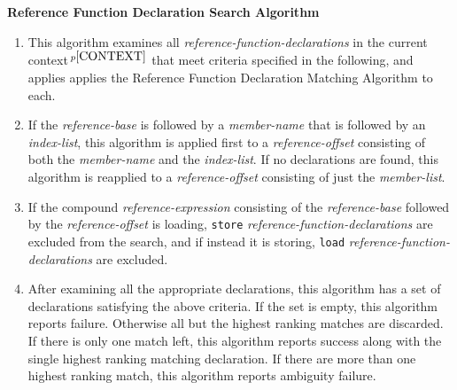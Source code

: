 \documentclass[12pt]{article}
\newcommand{\pagnote}[1]{$\,^{p\pageref{#1}}$}
\begin{document}
\centerline{\bf Reference Function Declaration Search Algorithm}
\begin{enumerate}
\item This algorithm examines all {\em reference-function-declarations}
in the current context\pagnote{CONTEXT} that meet criteria specified in
the following, and applies applies the Reference Function Declaration Matching
Algorithm to each.
\item If the {\em reference-base} is followed by a {\em member-name}
that is followed by an {\em index-list}, this algorithm is applied first
to a {\em reference-offset} consisting of both the {\em member-name}
and the {\em index-list}.  If no declarations are found, this algorithm
is reapplied to a {\em reference-offset} consisting of just the
{\em member-list}.
\item If the compound {\em reference-expression} consisting of the
{\em reference-base} followed by the {\em reference-offset} is loading,
{\tt store} {\em reference-function-declarations} are excluded from
the search, and
if instead it is storing, {\tt load} {\em reference-function-declarations}
are excluded.
\item
After examining all the appropriate declarations, this algorithm has
a set of declarations satisfying the above criteria.
If the set is empty, this algorithm reports failure.  Otherwise all but
the highest ranking matches are discarded.  If there is only one match
left, this algorithm reports success along with the single highest
ranking matching declaration.
If there are more than one highest ranking match, this algorithm reports
ambiguity failure.

\end{enumerate}

\bigskip
\end{document}
